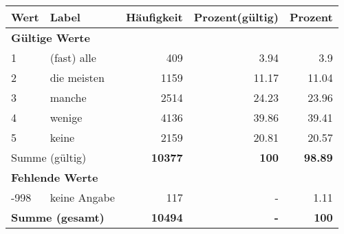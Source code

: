      \begin{longtable}{lXrrr}
     \toprule
     \textbf{Wert} & \textbf{Label} & \textbf{Häufigkeit} & \textbf{Prozent(gültig)} & \textbf{Prozent} \\
     \endhead
     \midrule
     \multicolumn{5}{l}{\textbf{Gültige Werte}}\\

     1 &
     \multicolumn{1}{X}{ (fast) alle   } &


       \num{409} &
       \num[round-mode=places,round-precision=2]{3,94} &
         \num[round-mode=places,round-precision=2]{3,9} \\

     2 &
     \multicolumn{1}{X}{ die meisten   } &


       \num{1159} &
       \num[round-mode=places,round-precision=2]{11,17} &
         \num[round-mode=places,round-precision=2]{11,04} \\

     3 &
     \multicolumn{1}{X}{ manche   } &


       \num{2514} &
       \num[round-mode=places,round-precision=2]{24,23} &
         \num[round-mode=places,round-precision=2]{23,96} \\

     4 &
     \multicolumn{1}{X}{ wenige   } &


       \num{4136} &
       \num[round-mode=places,round-precision=2]{39,86} &
         \num[round-mode=places,round-precision=2]{39,41} \\

     5 &
     \multicolumn{1}{X}{ keine   } &


       \num{2159} &
       \num[round-mode=places,round-precision=2]{20,81} &
         \num[round-mode=places,round-precision=2]{20,57} \\
     \midrule
     \multicolumn{2}{l}{Summe (gültig)} &
       \textbf{\num{10377}} &
     \textbf{100} &
       \textbf{\num[round-mode=places,round-precision=2]{98,89}} \\
     \multicolumn{5}{l}{\textbf{Fehlende Werte}}\\
       -998 &
       keine Angabe &
         \num{117} &
        - &
         \num[round-mode=places,round-precision=2]{1,11} \\
     \midrule
     \multicolumn{2}{l}{\textbf{Summe (gesamt)}} &
          \textbf{\num{10494}} &
        \textbf{-} &
        \textbf{100} \\
     \bottomrule
     \end{longtable}
     
